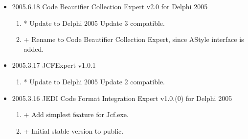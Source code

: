 \begin{itemize}
\item 2005.6.18 Code Beautifier Collection Expert v2.0 for Delphi 2005
	\begin{enumerate}
	\item * Update to Delphi 2005 Update 3 compatible.
	\item + Rename to Code Beautifier Collection Expert, since AStyle interface is added.
	\end{enumerate}

\item 2005.3.17 JCFExpert v1.0.1
	\begin{enumerate}
	\item * Update to Delphi 2005 Update 2 compatible.
	\end{enumerate}

\item 2005.3.16 JEDI Code Format Integration Expert v1.0.(0) for Delphi 2005
	\begin{enumerate}
	\item + Add simplest feature for Jcf.exe.
	\item + Initial stable version to public.
	\end{enumerate}

\end{itemize}
